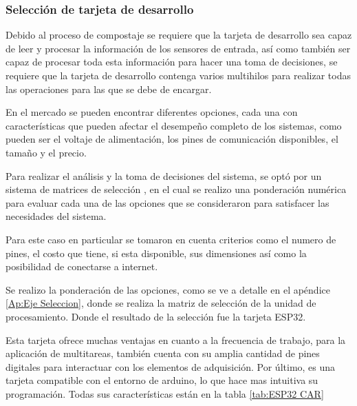 \subsubsection{Selección de tarjeta de desarrollo}

Debido al proceso de compostaje se requiere que la tarjeta de desarrollo sea capaz de leer y procesar la información de los sensores de entrada, así como también ser capaz de  procesar toda esta información para hacer una toma de decisiones, se requiere que la tarjeta  de desarrollo contenga  varios multihilos para realizar todas las operaciones para las que  se debe de encargar.

En el mercado se pueden encontrar diferentes opciones, cada una con características que pueden afectar el desempeño completo de los sistemas, como pueden ser el voltaje de alimentación, los pines de comunicación disponibles, el tamaño  y el precio. 

Para realizar el análisis y la toma de decisiones del sistema, se optó por un sistema de matrices de selección \cite{matselec32}, en el cual se realizo una ponderación numérica para evaluar cada una de las opciones que se consideraron para satisfacer las necesidades del sistema.

Para este caso en particular se tomaron en cuenta criterios como el numero de pines, el costo que tiene, si esta disponible, sus dimensiones así como la posibilidad de conectarse a internet. 

Se realizo la ponderación de las opciones, como se ve a detalle en el apéndice  \ref{Ap:Eje Seleccion}, donde se realiza la matriz de selección de la unidad de procesamiento.  Donde el resultado de la selección fue la tarjeta ESP32.

Esta tarjeta ofrece muchas ventajas en cuanto a la frecuencia de trabajo, para la aplicación de multitareas, también cuenta con su amplia cantidad de pines digitales para interactuar con los elementos de adquisición. Por último, es una tarjeta compatible con el entorno de arduino, lo que hace mas intuitiva su programación. Todas sus características están en la tabla \ref{tab:ESP32 CAR}

